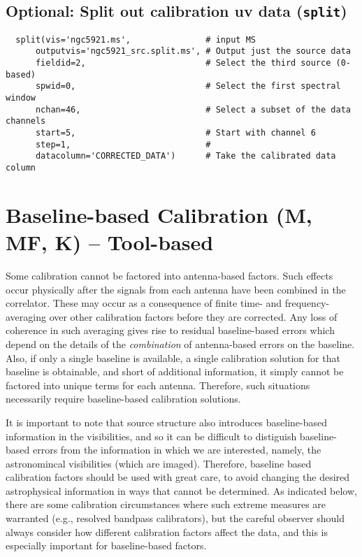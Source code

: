 \subsection{Optional: Split out calibration uv data ({\tt split})}
\label{subsection:synth.split}

\small
\begin{verbatim}
  split(vis='ngc5921.ms',               # input MS
      outputvis='ngc5921_src.split.ms', # Output just the source data
      fieldid=2,                        # Select the third source (0-based)
      spwid=0,                          # Select the first spectral window
      nchan=46,                         # Select a subset of the data channels
      start=5,                          # Start with channel 6 
      step=1,                           # 
      datacolumn='CORRECTED_DATA')      # Take the calibrated data column
\end{verbatim}
\normalsize



\section{Baseline-based Calibration (M, MF, K) -- Tool-based}
\label{section:synth.BL-based.cal}

Some calibration cannot be factored into antenna-based factors.  Such
effects occur physically after the signals from each antenna have been
combined in the correlator.  These may occur as a consequence of
finite time- and frequency-averaging over other calibration factors
before they are corrected.  Any loss of coherence in such averaging
gives rise to residual baseline-based errors which depend on the
details of the {\it combination} of antenna-based errors on the
baseline.  Also, if only a single baseline is available, a single
calibration solution for that baseline is obtainable, and short of
additional information, it simply cannot be factored into unique terms
for each antenna.  Therefore, such situations necessarily require
baseline-based calibration solutions.

It is important to note that source structure also introduces
baseline-based information in the visibilities, and so it can be
difficult to distiguish baseline-based errors from the information in
which we are interested, namely, the astronomincal visibilities (which
are imaged).  Therefore, baseline based calibration factors should be
used with great care, to avoid changing the desired astrophysical
information in ways that cannot be determined.  As indicated below,
there are some calibration circumstances where such extreme measures
are warranted (e.g., resolved bandpass calibrators), but the careful
observer should always consider how different calibration factors affect
the data, and this is especially important for baseline-based factors.

